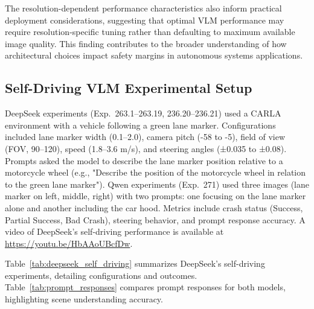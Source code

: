 The resolution-dependent performance characteristics also inform practical deployment considerations, suggesting that optimal VLM performance may require resolution-specific tuning rather than defaulting to maximum available image quality. This finding contributes to the broader understanding of how architectural choices impact safety margins in autonomous systems applications.


\subsection{Self-Driving VLM Experimental Setup}
DeepSeek experiments (Exp.~263.1--263.19, 236.20--236.21) used a CARLA environment with a vehicle following a green lane marker. Configurations included lane marker width (0.1--2.0), camera pitch (-58 to -5), field of view (FOV, 90--120), speed (1.8--3.6 m/s), and steering angles (±0.035 to ±0.08). Prompts asked the model to describe the lane marker position relative to a motorcycle wheel (e.g., "Describe the position of the motorcycle wheel in relation to the green lane marker"). Qwen experiments (Exp.~271) used three images (lane marker on left, middle, right) with two prompts: one focusing on the lane marker alone and another including the car hood. Metrics include crash status (Success, Partial Success, Bad Crash), steering behavior, and prompt response accuracy. A video of DeepSeek's self-driving performance is available at \url{https://youtu.be/HbAAoUBcfDw}.

Table~\ref{tab:deepseek_self_driving} summarizes DeepSeek's self-driving experiments, detailing configurations and outcomes. Table~\ref{tab:prompt_responses} compares prompt responses for both models, highlighting scene understanding accuracy.

